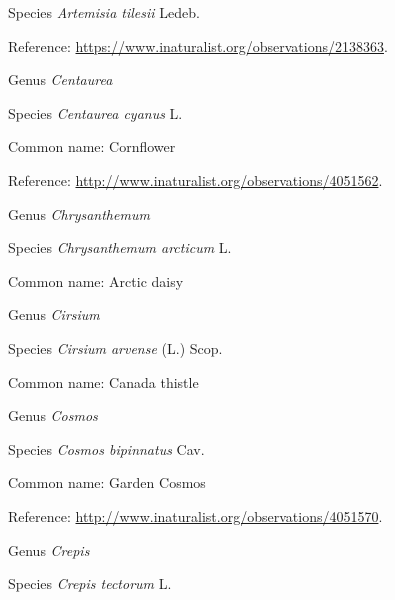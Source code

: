 \documentclass[9pt, article]{memoir}
\begin{document}
\begin{multicols}{2}
\vspace{6pt}\noindent\hspace{36pt}Species \textit{Artemisia tilesii} Ledeb.


Reference: 
\url{https://www.inaturalist.org/observations/2138363}.

\vspace{6pt}\noindent\hspace{30pt}Genus \textit{Centaurea}


\vspace{6pt}\noindent\hspace{36pt}Species \textit{Centaurea cyanus} L.


Common name: Cornflower

Reference: 
\url{http://www.inaturalist.org/observations/4051562}.

\vspace{6pt}\noindent\hspace{30pt}Genus \textit{Chrysanthemum}


\vspace{6pt}\noindent\hspace{36pt}Species \textit{Chrysanthemum arcticum} L.


Common name: Arctic daisy

\vspace{6pt}\noindent\hspace{30pt}Genus \textit{Cirsium}


\vspace{6pt}\noindent\hspace{36pt}Species \textit{Cirsium arvense} (L.) Scop.


Common name: Canada thistle

\vspace{6pt}\noindent\hspace{30pt}Genus \textit{Cosmos}


\vspace{6pt}\noindent\hspace{36pt}Species \textit{Cosmos bipinnatus} Cav.


Common name: Garden Cosmos

Reference: 
\url{http://www.inaturalist.org/observations/4051570}.

\vspace{6pt}\noindent\hspace{30pt}Genus \textit{Crepis}


\vspace{6pt}\noindent\hspace{36pt}Species \textit{Crepis tectorum} L.



\end{multicols}
\end{document}
